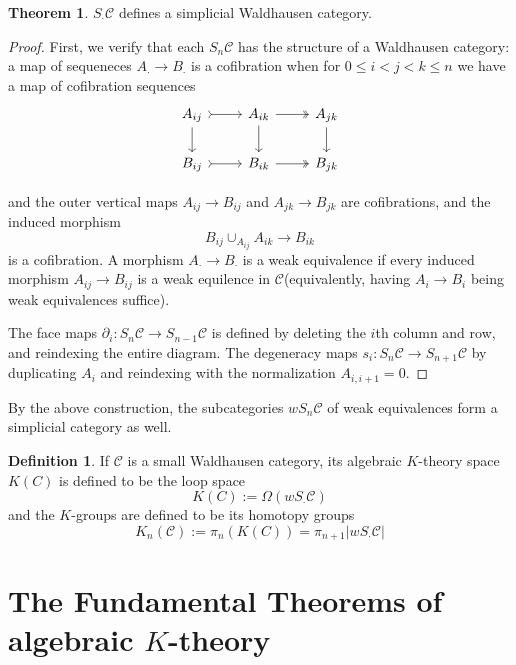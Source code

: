 \documentclass{article}
\theoremstyle{definition}
\newtheorem{theorem}{Theorem}[section]
\theoremstyle{definition}
\newtheorem{definition}{Definition}[theorem]
\theoremstyle{definition}
\theoremstyle{definition}
\theoremstyle{definition}
\theoremstyle{definition}
\theoremstyle{definition}
\begin{document}
\begin{tcolorbox}[colback=red!5!white,colframe=red!30!white]
\begin{theorem}
    $S_{\cdot} \mathcal{C}$ defines a simplicial Waldhausen category. 
\end{theorem}
\end{tcolorbox}
\begin{proof}
    First, we verify that each $S_n \mathcal{C}$ has the structure of a Waldhausen category: a map of sequeneces $A_{\cdot}\to B_{\cdot}$ is a cofibration when for $0\leq i<j< k\leq n$ we have a map of cofibration sequences 
    \[\begin{tikzcd}
        {A_{ij}} & {A_{ik}} & {A_{jk}} \\
        {B_{ij}} & {B_{ik}} & {B_{jk}}
        \arrow[tail, from=1-1, to=1-2]
        \arrow[from=1-1, to=2-1]
        \arrow[two heads, from=1-2, to=1-3]
        \arrow[from=1-2, to=2-2]
        \arrow[from=1-3, to=2-3]
        \arrow[tail, from=2-1, to=2-2]
        \arrow[two heads, from=2-2, to=2-3]
    \end{tikzcd}\]

and the outer vertical maps $A_{ij}\to B_{ij}$ and $A_{jk}\to B_{jk}$ are cofibrations, and the induced morphism $$B_{ij}\cup_{A_{ij}}A_{ik}\to B_{ik}$$ is a cofibration. A morphism $A_{\cdot}\to B_{\cdot}$ is a weak equivalence if every induced morphism $A_{ij}\to B_{ij}$ is a weak equilence in $\mathcal{C}$(equivalently, having $A_i\to B_i$ being weak equivalences suffice).

The face maps $\partial_i: S_n \mathcal{C}\to S_{n-1} \mathcal{C}$ is defined by deleting the $i$th column and row, and reindexing the entire diagram. The degeneracy maps $s_i: S_n \mathcal{C}\to S_{n+1} \mathcal{C}$ by duplicating $A_i$ and reindexing with the normalization $A_{i,i+1}=0$. 
\end{proof}
By the above construction, the subcategories $wS_n \mathcal{C}$ of weak equivalences form a simplicial category as well.


\begin{tcolorbox}[colback=purple!5!white,colframe=purple!75!black]
\begin{definition}
If $\mathcal{C}$ is a small Waldhausen category, its algebraic $K$-theory space $K(C)$ is defined to be the loop space
\[K(C):= \Omega (wS_{\cdot} \mathcal{C})\]
and the $K$-groups are defined to be its homotopy groups 
\[K_n(\mathcal{C}):=\pi_n(K(C))=\pi_{n+1}|wS_{\cdot}\mathcal{C}|\]
\end{definition}
\end{tcolorbox}









\section{The Fundamental Theorems of algebraic $K$-theory}
















\printbibliography
\end{document}
